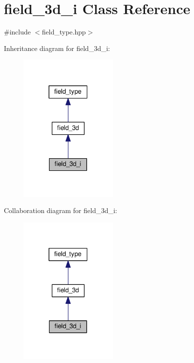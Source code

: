 \hypertarget{classfield__3d__i}{}\section{field\+\_\+3d\+\_\+i Class Reference}
\label{classfield__3d__i}


{\ttfamily \#include $<$field\+\_\+type.\+hpp$>$}



Inheritance diagram for field\+\_\+3d\+\_\+i\+:\nopagebreak
\begin{figure}[H]
\begin{center}
\leavevmode
\includegraphics[width=139pt]{db/d8f/classfield__3d__i__inherit__graph}
\end{center}
\end{figure}


Collaboration diagram for field\+\_\+3d\+\_\+i\+:\nopagebreak
\begin{figure}[H]
\begin{center}
\leavevmode
\includegraphics[width=139pt]{dd/ddc/classfield__3d__i__coll__graph}
\end{center}
\end{figure}
